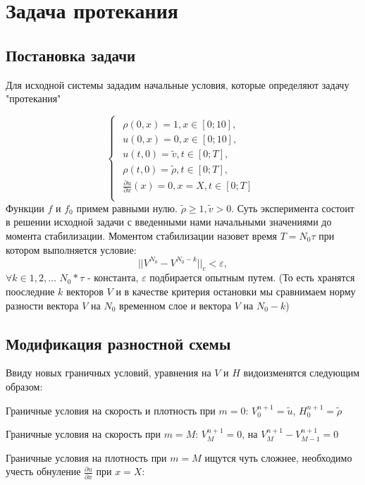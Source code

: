 \section{Задача протекания}
\subsection{Постановка задачи}

Для исходной системы зададим начальные условия, которые определяют задачу "протекания"

\begin{equation}
	\begin{cases}
		\begin{array}{l}
			\rho(0, x) = 1, x \in [0;10],\\
			u(0, x) = 0, x \in [0;10],\\
			u(t, 0) = \tilde{v}, t \in [0;T],\\
			\rho(t, 0) = \tilde{\rho}, t \in [0;T],\\			
			\frac{\partial u}{\partial x}(x) = 0, x=X, t \in [0;T]\\
		\end{array}
	\end{cases}
\end{equation}
Функции $f$ и $f_0$ примем равными нулю. $\tilde{\rho} \geqslant 1, \tilde{v} > 0 $. Суть эксперимента состоит в решении исходной задачи с введенными нами начальными значениями до момента стабилизации. Моментом стабилизации назовет время $T = N_0\tau$ при котором выполняется условие:
$$
||V^{N_0} - V^{N_0 - k}||_c < \varepsilon,
$$
$\forall k \in 1,2,\dots$ $N_0 * \tau$ - константа, $\varepsilon$ подбирается опытным путем. (То есть хранятся пооследние $k$ векторов $V$ и в качестве критерия остановки мы сравнимаем норму разности вектора $V$ на $N_0$ временном слое и вектора  $V$ на $N_0 - k$)

\subsection{Модификация разностной схемы}
Ввиду новых граничных условий, уравнения на $V$ и $H$ видоизменятся следующим образом:

Граничные условия на скорость и плотность при $m=0$:
$V_0^{n+1} = \tilde{u}$, $H_0^{n+1} = \tilde{\rho}$

Граничные условия на скорость при $m=M$:
$V_M^{n+1} = 0$, на $V_M^{n+1} - V_{M-1}^{n+1} = 0$

Граничные условия на плотность при $m=M$ ищутся чуть сложнее, необходимо учесть обнуление $\frac{\partial u}{\partial x}$ при $x=X$:\\

